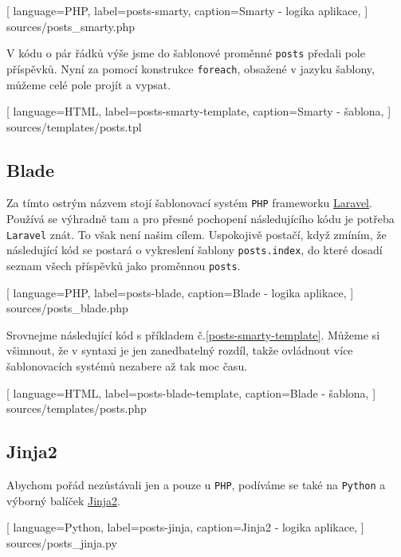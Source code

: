 \documentclass[10pt,a4paper]{article}
\begin{document}
			
			[
				language=PHP,
				label=posts-smarty,
				caption={Smarty - logika aplikace},
			] {sources/posts_smarty.php}
			\vspace{10pt}

			V kódu o pár řádků výše jsme do šablonové proměnné \texttt{posts} předali pole příspěvků. Nyní za pomocí konstrukce \texttt{foreach}, obsažené v jazyku šablony, můžeme celé pole projít a vypsat.

			
			[
				language=HTML,
				label=posts-smarty-template,
				caption={Smarty - šablona},
			] {sources/templates/posts.tpl}
			\vspace{10pt}


		\newpage
		\subsection{Blade}
			Za tímto ostrým názvem stojí šablonovací systém \texttt{PHP} frameworku \href{http://laravel.com/}{Laravel}. Používá se výhradně tam a pro přesné pochopení následujícího kódu je potřeba \texttt{Laravel} znát. To však není našim cílem. Uspokojivě postačí, když zmíním, že následující kód se postará o vykreslení šablony \texttt{posts.index}, do které dosadí seznam všech příspěvků jako proměnnou \texttt{posts}.

			
			[
				language=PHP,
				label=posts-blade,
				caption={Blade - logika aplikace},
			] {sources/posts_blade.php}
			\vspace{10pt}

			Srovnejme následující kód s příkladem č.\ref{posts-smarty-template}. Můžeme si všimnout, že v syntaxi je jen zanedbatelný rozdíl, takže ovládnout více šablonovacích systémů nezabere až tak moc času.
			
			[
				language=HTML,
				label=posts-blade-template,
				caption={Blade - šablona},
			] {sources/templates/posts.php}
			\vspace{10pt}


		\newpage
		\subsection{Jinja2}
			Abychom pořád nezůstávali jen a pouze u \texttt{PHP}, podíváme se také na \texttt{Python} a výborný balíček \href{http://jinja.pocoo.org/}{Jinja2}.

			
			[
				language=Python,
				label=posts-jinja,
				caption={Jinja2 - logika aplikace},
			] {sources/posts_jinja.py}
			\vspace{10pt}
\end{document}
